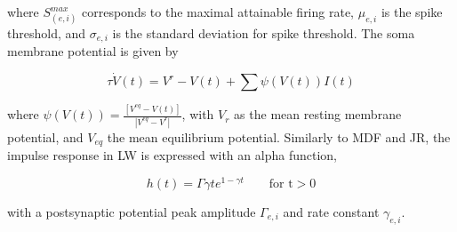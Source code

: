\documentclass[12pt,twoside]{article}
\begin{document}
where $S_{(e,i)}^{max}$ corresponds to the maximal attainable firing rate, $\mu_{e,i}$ is the spike threshold, and $\sigma_{e,i}$ is the standard deviation for spike threshold. The soma membrane potential is given by 

\begin{equation}
    \tau \dot{V}(t)=V^r-V(t)+\sum \psi(V(t))I(t)
\end{equation}

where $\psi(V(t))=\frac{[V^{eq}-V(t)]}{|V^{eq}-V^r|} $, with $V_{r}$ as the mean resting membrane potential, and $V_{eq}$ the mean equilibrium potential. Similarly to MDF and JR, the impulse response in LW is expressed with an alpha function,

\begin{equation}
    h(t)=\Gamma \gamma te^{1-\gamma t}  \qquad  \text{for t} >  0
\end{equation}

with a postsynaptic potential peak amplitude $\Gamma_{e,i}$ and rate constant $\gamma_{e,i}$.
\end{document}
